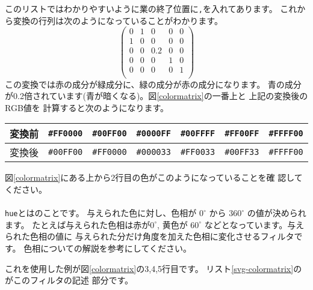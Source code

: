 このリストではわかりやすいように業の終了位置に\texttt{,}を入れてあります。
これから変換の行列は次のようになっていることがわかります。
\[
\left(\begin{array}{ccccc}
0 & 1 & 0  & 0 & 0\\
1 & 0 & 0  & 0 & 0\\
0 & 0 & 0.2& 0 & 0\\
0 & 0 & 0  & 1 & 0\\
0 & 0 & 0  & 0 & 1\\
\end{array}\right) 
\]
この変換では赤の成分が緑成分に、緑の成分が赤の成分になります。
青の成分が0.2倍されています(青が暗くなる)。図\ref{colormatrix}の一番上と
上記の変換後のRGB値を
計算すると次のようになります。
\begin{center}
\begin{tabular}{|c|c|c|c|c|c|c|}
 \hline
変換前&\texttt{\#FF0000}&\texttt{\#00FF00}& \texttt{\#0000FF}
      &\texttt{\#00FFFF}&\texttt{\#FF00FF}& \texttt{\#FFFF00}\\\hline
変換後&\texttt{\#00FF00}&\texttt{\#FF0000}& \texttt{\#000033}
      &\texttt{\#FF0033}&\texttt{\#00FF33}& \texttt{\#FFFF00}\\\hline
\end{tabular}
\end{center}
図\ref{colormatrix}にある上から2行目の色がこのようになっていることを確
認してください。
\paragraph{}
\texttt{hue}とはのことです。
与えられた色に対し、色相が
$0^{\circ}$ から $360^{\circ}$ の値が決められます。
たとえば与えられた色相は赤が$0^{\circ}$,
黄色が $60^{\circ}$ などとなっています。与えられた色相の値に
与えられた分だけ角度を加えた色相に変化させるフィルタです。
{色相についての解説}を参考にしてください。

これを使用した例が図\ref{colormatrix}の3,4,5行目です。
リスト\ref{svg-colormatrix}のがこのフィルタの記述
部分です。


